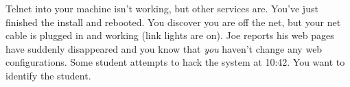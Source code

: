 \ques
Telnet into your machine isn't working, but other services are.
\vfill
\ques
You've just finished the install and rebooted.
You discover you are off the net, but your net cable is plugged in
and working (link lights are on).
\vfill
\ques
Joe reports his web pages have suddenly disappeared
and you know that {\it you} haven't change any web configurations.
\vfill
\ques
Some student attempts to hack the system at 10:42.
You want to identify the student.
\bye
